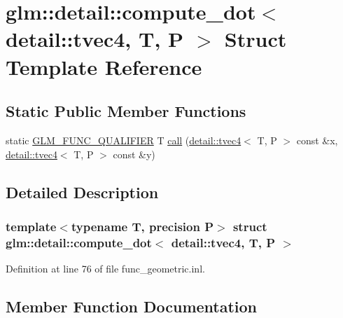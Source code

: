\hypertarget{structglm_1_1detail_1_1compute__dot_3_01detail_1_1tvec4_00_01_t_00_01_p_01_4}{}\section{glm\+:\+:detail\+:\+:compute\+\_\+dot$<$ detail\+:\+:tvec4, T, P $>$ Struct Template Reference}
\label{structglm_1_1detail_1_1compute__dot_3_01detail_1_1tvec4_00_01_t_00_01_p_01_4}
\subsection*{Static Public Member Functions}
\begin{DoxyCompactItemize}
\item 
static \hyperlink{setup_8hpp_a33fdea6f91c5f834105f7415e2a64407}{G\+L\+M\+\_\+\+F\+U\+N\+C\+\_\+\+Q\+U\+A\+L\+I\+F\+I\+ER} T \hyperlink{structglm_1_1detail_1_1compute__dot_3_01detail_1_1tvec4_00_01_t_00_01_p_01_4_acc311c73135c616fd126c216454759e2}{call} (\hyperlink{structglm_1_1detail_1_1tvec4}{detail\+::tvec4}$<$ T, P $>$ const \&x, \hyperlink{structglm_1_1detail_1_1tvec4}{detail\+::tvec4}$<$ T, P $>$ const \&y)
\end{DoxyCompactItemize}


\subsection{Detailed Description}
\subsubsection*{template$<$typename T, precision P$>$\newline
struct glm\+::detail\+::compute\+\_\+dot$<$ detail\+::tvec4, T, P $>$}



Definition at line 76 of file func\+\_\+geometric.\+inl.



\subsection{Member Function Documentation}
\mbox{\label{structglm_1_1detail_1_1compute__dot_3_01detail_1_1tvec4_00_01_t_00_01_p_01_4_acc311c73135c616fd126c216454759e2}} 
